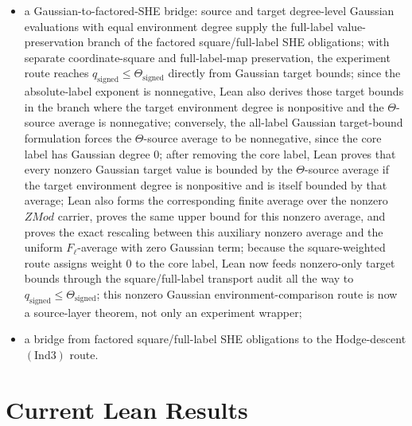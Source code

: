 \documentclass[11pt]{article}
\begin{document}
\begin{itemize}
  structured-SHE target full-label bounds by the \(\Theta\)-source average feed
  the cusp-class container route all the way to
  \(q_{\mathrm{signed}}\le\Theta_{\mathrm{signed}}\); the same final comparison
  is now available directly from the primitive factored square/full-label SHE
  obligations, without requiring a prebuilt transport-audit argument;
\item a Gaussian-to-factored-SHE bridge:
  source and target degree-level Gaussian evaluations with equal environment
  degree supply the full-label value-preservation branch of the factored
  square/full-label SHE obligations; with separate coordinate-square and
  full-label-map preservation, the experiment route reaches
  \(q_{\mathrm{signed}}\le\Theta_{\mathrm{signed}}\) directly from Gaussian
  target bounds; since the absolute-label exponent is nonnegative, Lean also
  derives those target bounds in the branch where the target environment degree
  is nonpositive and the \(\Theta\)-source average is nonnegative; conversely,
  the all-label Gaussian target-bound formulation forces the
  \(\Theta\)-source average to be nonnegative, since the core label has
  Gaussian degree \(0\); after removing the core label, Lean proves that every
  nonzero Gaussian target value is bounded by the \(\Theta\)-source average if
  the target environment degree is nonpositive and is itself bounded by that
  average; Lean also forms the corresponding finite average over the nonzero
  \(ZMod\) carrier, proves the same upper bound for this nonzero average, and
  proves the exact rescaling between this auxiliary nonzero average and the
  uniform \(F_\ell\)-average with zero Gaussian term;
  because the square-weighted route assigns weight \(0\) to the core label, Lean
  now feeds nonzero-only target bounds through the square/full-label transport
  audit all the way to \(q_{\mathrm{signed}}\le\Theta_{\mathrm{signed}}\); this
  nonzero Gaussian environment-comparison route is now a source-layer theorem,
  not only an experiment wrapper;
\item a bridge from factored square/full-label SHE obligations to the
  Hodge-descent \((\mathrm{Ind3})\) route.
\end{itemize}

\section{Current Lean Results}
\end{document}
